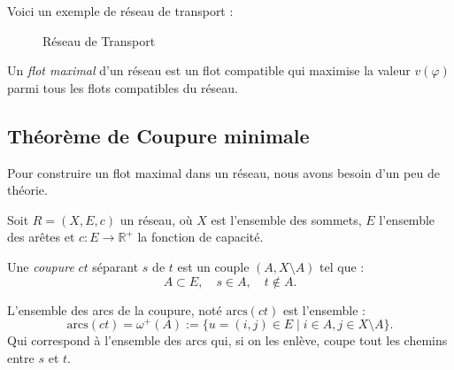 \begin{example}
    Voici un exemple de réseau de transport : 
    \begin{figure}[h]
        \centering 
        \caption{Réseau de Transport}
    \end{figure}
\end{example}

\begin{definition}
    Un \emph{flot maximal} d'un réseau est un flot compatible qui maximise la valeur 
    $v(\varphi)$ parmi tous les flots compatibles du réseau.
\end{definition}

\subsection{Théorème de Coupure minimale}

Pour construire un flot maximal dans un réseau, nous avons besoin d'un peu de théorie. 

\begin{definition}
    Soit $R = (X, E, c)$ un réseau, où $X$ est l'ensemble des sommets, $E$ l'ensemble des arêtes
    et $c : E \to \mathbb{R}^+$ la fonction de capacité. 
    
    Une \emph{coupure} $ct$ séparant $s$ de $t$ est un couple $(A, X \setminus A)$ tel que :
    \[
        A \subset E, \quad s \in A, \quad t \notin A.
    \]
    
    L'ensemble des arcs de la coupure, noté $\mathrm{arcs}(ct)$ est l'ensemble :
    \[
        \mathrm{arcs}(ct) = \omega^+(A) := \{ u = (i,j) \in E \mid i \in A, j \in X \setminus A \}.
    \]
    Qui correspond à l'ensemble des arcs qui, si on les enlève, coupe tout les chemins entre $s$ et $t$. 
\end{definition}

